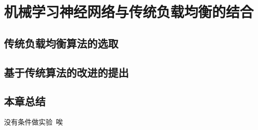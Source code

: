 \chapter{机械学习神经网络与传统负载均衡的结合}

\section{传统负载均衡算法的选取}

\section{基于传统算法的改进的提出}

\section{本章总结}

没有条件做实验~唉
